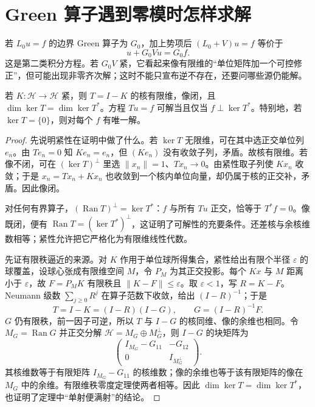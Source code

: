 \section{Green 算子遇到零模时怎样求解}

若 \(L_0u=f\) 的边界 Green 算子为 \(G_0\)，加上势项后 \((L_0+V)u=f\) 等价于
\[
u+G_0Vu=G_0f.
\]
这是第二类积分方程。若 \(G_0V\) 紧，它看起来像有限维的“单位矩阵加一个可控修正”，但可能出现非零齐次解；这时不能只宣布逆不存在，还要问哪些源仍能解。

\begin{theorem}
若 \(K:\mathcal H\to\mathcal H\) 紧，则 \(T=I-K\) 的核有限维，像闭，且 \(\dim\ker T=\dim\ker T^*\)。方程 \(Tu=f\) 可解当且仅当 \(f\perp\ker T^*\)。特别地，若 \(\ker T=\{0\}\)，则对每个 \(f\) 有唯一解。
\end{theorem}

\begin{proof}
先说明紧性在证明中做了什么。若 \(\ker T\) 无限维，可在其中选正交单位列 \(e_n\)。由 \(Te_n=0\) 知 \(Ke_n=e_n\)，但 \((Ke_n)\) 没有收敛子列，矛盾。故核有限维。若像不闭，可在 \((\ker T)^\perp\) 里选 \(\|x_n\|=1\)、\(Tx_n\to0\)。由紧性取子列使 \(Kx_n\) 收敛；于是 \(x_n=Tx_n+Kx_n\) 也收敛到一个核内单位向量，却仍属于核的正交补，矛盾。因此像闭。

对任何有界算子，\((\operatorname{Ran}T)^\perp=\ker T^*\)：\(f\) 与所有 \(Tu\) 正交，恰等于 \(T^*f=0\)。像既闭，便有 \(\operatorname{Ran}T=(\ker T^*)^\perp\)，这证明了可解性的充要条件。还差核与余核维数相等；紧性允许把它严格化为有限维线性代数。

先证有限秩逼近的来源。对 \(K\) 作用于单位球所得集合，紧性给出有限个半径 \(\varepsilon\) 的球覆盖，设球心张成有限维空间 \(M\)，令 \(P_M\) 为其正交投影。每个 \(Kx\) 与 \(M\) 距离小于 \(\varepsilon\)，故 \(F=P_MK\) 有限秩且 \(\|K-F\|\le\varepsilon\)。取 \(\varepsilon<1\)，写 \(R=K-F\)。Neumann 级数 \(\sum_{j\ge0}R^j\) 在算子范数下收敛，给出 \((I-R)^{-1}\)；于是
\[
T=I-K=(I-R)(I-G),\qquad G=(I-R)^{-1}F.
\]
\(G\) 仍有限秩，前一因子可逆，所以 \(T\) 与 \(I-G\) 的核同维、像的余维也相同。令 \(M_G=\operatorname{Ran}G\) 并正交分解 \(\mathcal H=M_G\oplus M_G^\perp\)，则 \(I-G\) 的块矩阵为
\[
\begin{pmatrix}I_{M_G}-G_{11}&-G_{12}\\0&I_{M_G^\perp}\end{pmatrix}.
\]
其核维数等于有限矩阵 \(I_{M_G}-G_{11}\) 的核维数；像的余维也等于该有限矩阵的像在 \(M_G\) 中的余维。有限维秩零度定理使两者相等。因此 \(\dim\ker T=\dim\ker T^*\)，也证明了定理中“单射便满射”的结论。
\end{proof}

